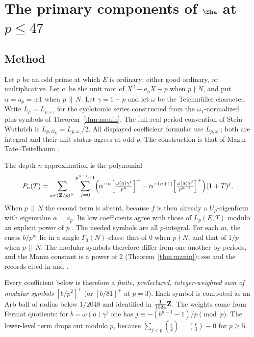 \section[Primary components at primes up to 47]{The primary components of $\Sha$ at $p\le47$}\label{sec:primary}

\subsection{Method}\label{subsec:method}
Let $p$ be an odd prime at which $E$ is ordinary: either good ordinary, or multiplicative. Let $\alpha$ be the unit root of $X^2-a_pX+p$ when $p\nmid N$, and put $\alpha=a_p=\pm1$ when $p\,\|\,N$. Let $\gamma=1+p$ and let $\omega$ be the Teichm\"uller character. Write $L_p=L_{p,\omega_1}$ for the cyclotomic series constructed from the $\omega_1$-normalized plus symbols of Theorem~\ref{thm:manin}. The full-real-period convention of Stein--Wuthrich \cite{sw} is $L_{p,\Omega_E}=L_{p,\omega_1}/2$. All displayed coefficient formulas use $L_{p,\omega_1}$; both are integral and their unit status agrees at odd $p$. The construction is that of Mazur--Tate--Teitelbaum \cite{mtt}.

The depth-$n$ approximation is the polynomial
\[
P_n(T)=\sum_{a\in(\mathbf{Z}/p)^\times}\sum_{j=0}^{p^{n-1}-1}\Bigl(\alpha^{-n}\Bigl[\tfrac{\omega(a)\gamma^j}{p^n}\Bigr]^+-\alpha^{-(n+1)}\Bigl[\tfrac{\omega(a)\gamma^j}{p^{n-1}}\Bigr]^+\Bigr)(1+T)^j .
\]
When $p\,\|\,N$ the second term is absent, because $f$ is then already a $U_p$-eigenform with eigenvalue $\alpha=a_p$. Its low coefficients agree with those of $L_p(E,T)$ modulo an explicit power of $p$ \cite[Prop.~3.5]{sw}. The needed symbols are all $p$-integral. For each $m$, the cusps $b/p^m$ lie in a single $\Gamma_0(N)$-class: that of $0$ when $p\nmid N$, and that of $1/p$ when $p\,\|\,N$. The modular symbols therefore differ from one another by periods, and the Manin constant is a power of $2$ (Theorem~\ref{thm:manin}); see \cite[\S3]{sw} and the records cited in  and .

Every coefficient below is therefore a \emph{finite, predeclared, integer-weighted sum of modular symbols} $[b/p^2]^+$ (or $[b/81]^+$ at $p=3$). Each symbol is computed as an Arb ball of radius below $1/2048$ and identified in $\frac1{1024}\mathbf{Z}$. The weights come from Fermat quotients: for $b=\omega(a)\gamma^j$ one has $j\equiv-(b^{p-1}-1)/p\pmod p$. The lower-level term drops out modulo $p$, because $\sum_{j<p}\binom j2=\binom p3\equiv0$ for $p\ge5$.

